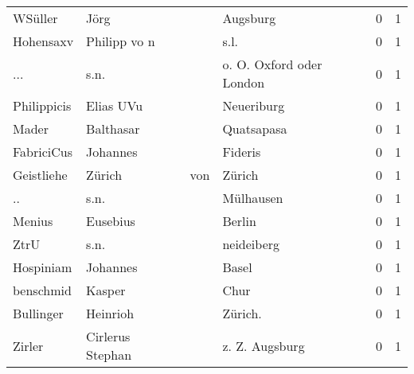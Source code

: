 \begin{center}
\begin{tiny}
\begin{longtabu}{llllrr}
                  WSüller &                               Jörg &             &                                    Augsburg &          0 &         1 \\
                Hohensaxv &                       Philipp vo n &             &                                        s.l. &          0 &         1 \\
                      ... &                               s.n. &             &                    o. O. Oxford oder London &          0 &         1 \\
              Philippicis &                          Elias UVu &             &                                  Neueriburg &          0 &         1 \\
                    Mader &                          Balthasar &             &                                  Quatsapasa &          0 &         1 \\
               FabriciCus &                           Johannes &             &                                     Fideris &          0 &         1 \\
               Geistliehe &                             Zürich &         von &                                      Zürich &          0 &         1 \\
                       .. &                               s.n. &             &                                   Mülhausen &          0 &         1 \\
                   Menius &                           Eusebius &             &                                      Berlin &          0 &         1 \\
                     ZtrU &                               s.n. &             &                                  neideiberg &          0 &         1 \\
                Hospiniam &                           Johannes &             &                                       Basel &          0 &         1 \\
                benschmid &                             Kasper &             &                                        Chur &          0 &         1 \\
                Bullinger &                           Heinrioh &             &                                    Zürich.  &          0 &         1 \\
                   Zirler &                   Cirlerus Stephan &             &                              z. Z. Augsburg &          0 &         1 \\

\end{longtabu}
\end{tiny}
\end{center}
